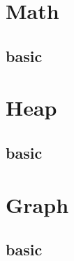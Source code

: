 \section{Math}
    \subsection{basic}
        

\section{Heap}
    \subsection{basic}
        

\section{Graph}
    \subsection{basic}
        